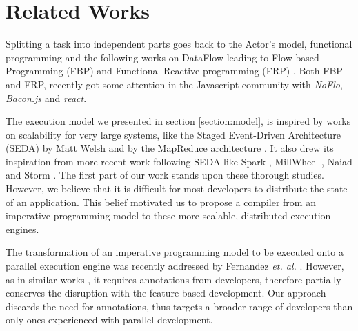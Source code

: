 \section{Related Works} \label{section:related}

Splitting a task into independent parts goes back to the Actor's model, functional programming \cite{Hughes1989} and the following works on Data\-Flow leading to Flow-based Programming (FBP) and Functional Reactive program\-ming (FRP) \cite{Elliott1997}.
Both FBP and FRP, recently got some attention in the Javascript community with \textit{NoFlo}, \textit{Bacon.js} and \textit{react}.

The execution model we presented in section \ref{section:model}, is inspired by works on scalability for very large systems, like the Staged Event-Driven Architecture (SEDA) by Matt Welsh \cite{Welsh2000} and by the MapReduce architecture \cite{Dean2008}.
It also drew its inspiration from more recent work following SEDA like Spark \cite{Zaharia2012}, MillWheel \cite{Akidau2013}, Naiad \cite{McSherry} and Storm \cite{Toshniwal2014}.
The first part of our work stands upon these thorough studies.
However, we believe that it is difficult for most developers to distribute the state of an application.
This belief motivated us to propose a compiler from an imperative programming model to these more scalable, distributed execution engines.


The transformation of an imperative programming model to be executed onto a parallel execution engine was recently addressed by Fernandez \textit{et. al.} \cite{Fernandez2014a}.
However, as in similar works \cite{Power2010}, it requires annotations from developers, therefore partially conserves the disruption with the feature-based development.
Our approach discards the need for annotations, thus targets a broader range of developers than only ones experienced with parallel development.

